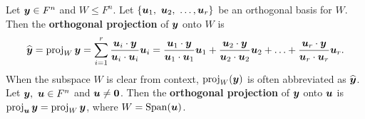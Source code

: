 

\begin{Def} Let $\boldsymbol y\in F^n$ and $W\le F^n$. Let $\{\boldsymbol u_1,\ \boldsymbol u_2,\ \ldots, \boldsymbol u_r\}$ be an orthogonal basis for $W$. Then the \textbf{orthogonal projection} of $\boldsymbol y$ onto $W$ is 
\[\widehat{\boldsymbol y} = \operatorname{proj}_W \boldsymbol y = \sum_{i=1}^r\dfrac{\boldsymbol u_i \cdot \boldsymbol y}{\boldsymbol u_i\cdot \boldsymbol u_i}\boldsymbol u_i = \dfrac{\boldsymbol u_1 \cdot \boldsymbol y}{\boldsymbol u_1\cdot \boldsymbol u_1}\boldsymbol u_1 + \dfrac{\boldsymbol u_2 \cdot \boldsymbol y}{\boldsymbol u_2\cdot \boldsymbol u_2}\boldsymbol u_2+ \ldots + \dfrac{\boldsymbol u_r \cdot \boldsymbol y}{\boldsymbol u_r\cdot \boldsymbol u_r}\boldsymbol u_r.\] When the subspace $W$ is clear from context, $\operatorname{proj}_W(\boldsymbol y)$ is often abbreviated as $\widehat{\boldsymbol y}$.\\

Let $\boldsymbol y,\ \boldsymbol u \in F^n$ and $\boldsymbol u \neq \boldsymbol 0$.  Then the \textbf{orthogonal projection} of $\boldsymbol y$ onto $\boldsymbol u$ is $\operatorname{proj}_{\boldsymbol u} \boldsymbol y = \operatorname{proj}_W \boldsymbol y$, where $W = \operatorname{Span}(\boldsymbol u)$. 
\end{Def}\vs

